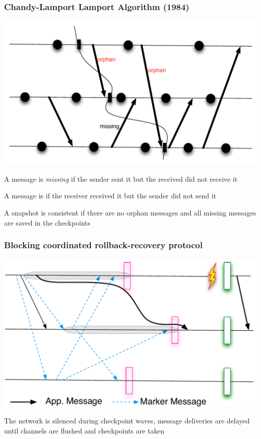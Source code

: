 \begin{frame}
  \frametitle{Chandy-Lamport Lamport Algorithm (1984)}

  \begin{center}
    \includegraphics[width=.6\linewidth]{coordinated-idea-orphan.pdf}
  \end{center}

  A message is \emph{missing} if the sender sent it but the received did not receive it

  A message is  if the receiver received it but the sender did not send it

  A snapshot is consistent if there are no orphan messages and all missing messages are saved in the checkpoints
  
\end{frame}

\begin{frame}
  \frametitle{Blocking coordinated rollback-recovery protocol}

  \begin{center}
    \includegraphics[width=.6\linewidth]{blocking-coordinated.pdf}
  \end{center}

  The network is silenced during checkpoint waves, message deliveries are delayed until channels are flushed and checkpoints are taken
\end{frame}

